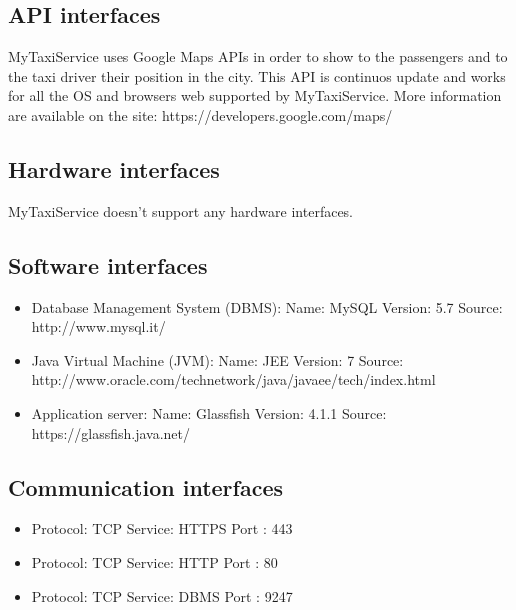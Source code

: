 \subsection{API interfaces}
MyTaxiService uses Google Maps APIs in order to show to the passengers and to the taxi driver their position in the city.
This API is continuos update and works for all the OS and browsers web supported by MyTaxiService.
More information are available on the site: https://developers.google.com/maps/

\subsection{Hardware interfaces}
MyTaxiService doesn't support any hardware interfaces.	\subsection{Software interfaces}
\begin{itemize}
	\item Database Management System (DBMS): \newline
	Name: MySQL \newline
	Version: 5.7 \newline
	Source: http://www.mysql.it/ 
	\item Java Virtual Machine (JVM):\newline
	Name: JEE \newline
	Version: 7 \newline
	Source: http://www.oracle.com/technetwork/java/javaee/tech/index.html
	\item Application server: \newline
	Name: Glassfish \newline
	Version: 4.1.1 \newline
	Source: https://glassfish.java.net/
\end{itemize}
\subsection{Communication interfaces}
\begin{itemize}
	\item Protocol: TCP Service: HTTPS Port : 443
	\item Protocol: TCP Service: HTTP  Port : 80
	\item Protocol: TCP Service: DBMS  Port : 9247
\end{itemize}
